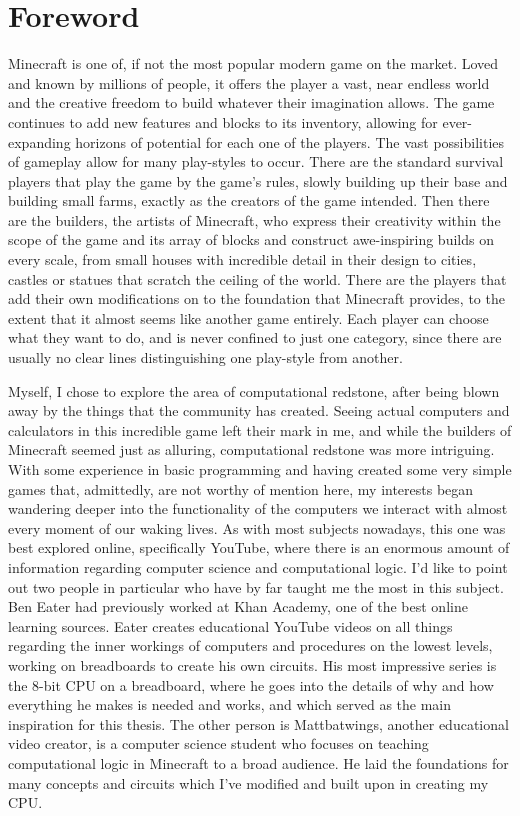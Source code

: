 \chapter{Foreword}

\label{Foreword}

Minecraft is one of, if not the most popular modern game on the market. Loved and known by millions of people, it offers the player a vast, near endless world and the creative freedom to build whatever their imagination allows. The game continues to add new features and blocks to its inventory, allowing for ever-expanding horizons of potential for each one of the players. The vast possibilities of gameplay allow for many play-styles to occur. There are the standard survival players that play the game by the game's rules, slowly building up their base and building small farms, exactly as the creators of the game intended. Then there are the builders, the artists of Minecraft, who express their creativity within the scope of the game and its array of blocks and construct awe-inspiring builds on every scale, from small houses with incredible detail in their design to cities, castles or statues that scratch the ceiling of the world. There are the players that add their own modifications on to the foundation that Minecraft provides, to the extent that it almost seems like another game entirely. Each player can choose what they want to do, and is never confined to just one category, since there are usually no clear lines distinguishing one play-style from another.

Myself, I chose to explore the area of computational redstone, after being blown away by the things that the community has created. Seeing actual computers and calculators in this incredible game left their mark in me, and while the builders of Minecraft seemed just as alluring, computational redstone was more intriguing. With some experience in basic programming and having created some very simple games that, admittedly, are not worthy of mention here, my interests began wandering deeper into the functionality of the computers we interact with almost every moment of our waking lives. As with most subjects nowadays, this one was best explored online, specifically YouTube, where there is an enormous amount of information regarding computer science and computational logic. I'd like to point out two people in particular who have by far taught me the most in this subject. Ben Eater \cite{BenEater} had previously worked at Khan Academy, one of the best online learning sources. Eater creates educational YouTube videos on all things regarding the inner workings of computers and procedures on the lowest levels, working on breadboards to create his own circuits. His most impressive series is the 8-bit CPU on a breadboard, where he goes into the details of why and how everything he makes is needed and works, and which served as the main inspiration for this thesis. The other person is Mattbatwings, another educational video creator, is a computer science student who focuses on teaching computational logic in Minecraft to a broad audience. He laid the foundations for many concepts and circuits which I've modified and built upon in creating my CPU.

